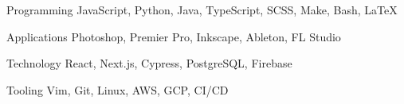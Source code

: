 

\begin{cvskills}

  \cvskill
    {Programming} %
    {JavaScript, Python, Java, TypeScript, SCSS, Make, Bash, \LaTeX} %

  \cvskill
    {Applications} %
    {Photoshop, Premier Pro, Inkscape, Ableton, FL Studio} %

  \cvskill
    {Technology} %
    {React, Next.js, Cypress, PostgreSQL, Firebase} %

  \cvskill
    {Tooling} %
    {Vim, Git, Linux, AWS, GCP, CI/CD} %

\end{cvskills}
